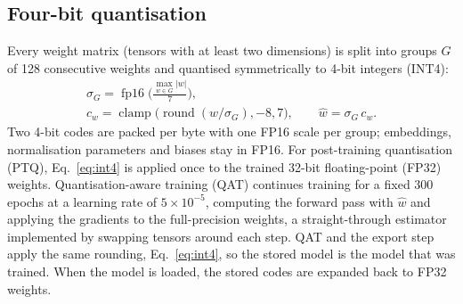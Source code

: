 \documentclass[pdflatex,sn-mathphys-num,twocolumn]{sn-jnl}
\theoremstyle{thmstyleone}%
\begin{document}
\subsection{Four-bit quantisation}\label{sec:method:quant}
Every weight matrix (tensors with at least two dimensions) is split into groups $G$ of 128 consecutive weights and quantised symmetrically to 4-bit integers (INT4):
\begin{equation}
\begin{gathered}\sigma_G=\operatorname{fp16}\!\Big(\frac{\max_{w\in G}|w|}{7}\Big),\\ c_w=\operatorname{clamp}\big(\operatorname{round}(w/\sigma_G),-8,7\big),\qquad \hat{w}=\sigma_G\,c_w.\end{gathered}\label{eq:int4}
\end{equation}
Two 4-bit codes are packed per byte with one FP16 scale per group; embeddings, normalisation parameters and biases stay in FP16. For post-training quantisation (PTQ), Eq.~\eqref{eq:int4} is applied once to the trained 32-bit floating-point (FP32) weights. Quantisation-aware training (QAT) continues training for a fixed 300 epochs at a learning rate of $5\times10^{-5}$, computing the forward pass with $\hat{w}$ and applying the gradients to the full-precision weights, a straight-through estimator~\cite{bengio2013ste,jacob2018quant} implemented by swapping tensors around each step. QAT and the export step apply the same rounding, Eq.~\eqref{eq:int4}, so the stored model is the model that was trained. When the model is loaded, the stored codes are expanded back to FP32 weights.
\end{document}

